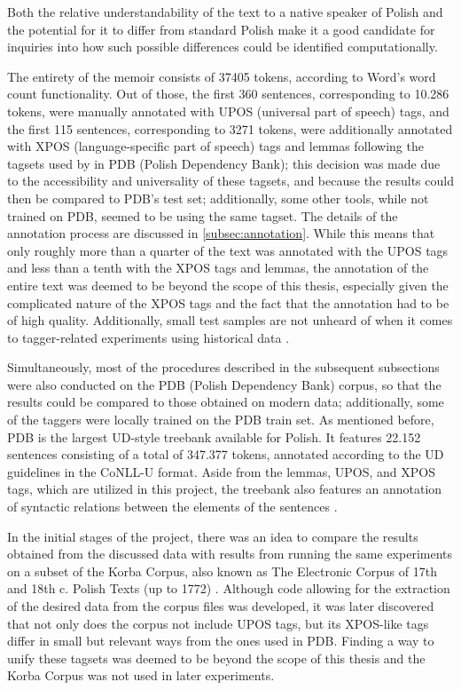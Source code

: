 Both the relative understandability of the text to a native speaker of Polish and the potential for it to differ from standard Polish make it a good candidate for inquiries into how such possible differences could be identified computationally.

The entirety of the memoir consists of 37405 tokens, according to Word's word count functionality. Out of those, the first 360 sentences, corresponding to 10.286 tokens, were manually annotated with UPOS (universal part of speech) tags, and the first 115 sentences, corresponding to 3271 tokens, were additionally annotated with XPOS (language-specific part of speech) tags and lemmas following the tagsets used by \citet{wroblewska-2018-extended} in PDB (Polish Dependency Bank); this decision was made due to the accessibility and universality of these tagsets, and because the results could then be compared to PDB's test set; additionally, some other tools, while not trained on PDB, seemed to be using the same tagset. The details of the annotation process are discussed in \autoref{subsec:annotation}. While this means that only roughly more than a quarter of the text was annotated with the UPOS tags and less than a tenth with the XPOS tags and lemmas, the annotation of the entire text was deemed to be beyond the scope of this thesis, especially given the complicated nature of the XPOS tags and the fact that the annotation had to be of high quality. Additionally, small test samples are not unheard of when it comes to tagger-related experiments using historical data \citep{bollmann-2013-pos, hupkes16, rayson07}. 

Simultaneously, most of the procedures described in the subsequent subsections were also conducted on the PDB (Polish Dependency Bank) corpus, so that the results could be compared to those obtained on modern data; additionally, some of the taggers were locally trained on the PDB train set. As mentioned before, PDB is the largest UD-style treebank available for Polish. It features 22.152 sentences consisting of a total of 347.377 tokens, annotated according to the UD guidelines in the CoNLL-U format. Aside from the lemmas, UPOS, and XPOS tags, which are utilized in this project, the treebank also features an annotation of syntactic relations between the elements of the sentences \citep{wroblewska-2018-extended, universaldependencies}.

In the initial stages of the project, there was an idea to compare the results obtained from the discussed data with results from running the same experiments on a subset of the Korba Corpus, also known as The Electronic Corpus of 17th and 18th c. Polish Texts (up to 1772) \citep{korba}. Although code allowing for the extraction of the desired data from the corpus files was developed, it was later discovered that not only does the corpus not include UPOS tags, but its XPOS-like tags differ in small but relevant ways from the ones used in PDB. Finding a way to unify these tagsets was deemed to be beyond the scope of this thesis and the Korba Corpus was not used in later experiments. 

